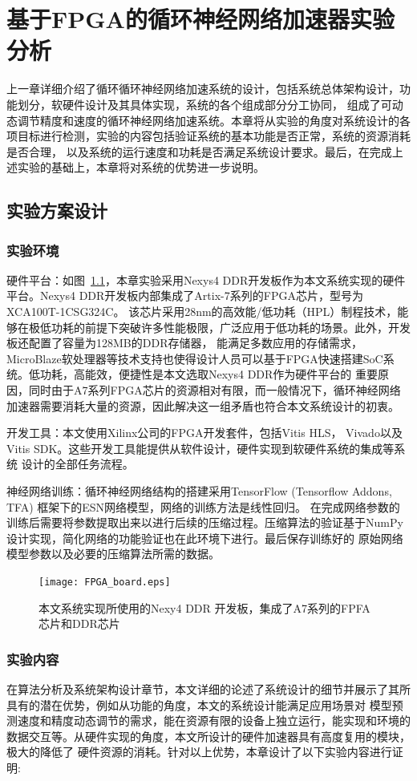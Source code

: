 \chapter{基于FPGA的循环神经网络加速器实验分析}
上一章详细介绍了循环循环神经网络加速系统的设计，包括系统总体架构设计，功能划分，软硬件设计及其具体实现，系统的各个组成部分分工协同，
组成了可动态调节精度和速度的循环神经网络加速系统。本章将从实验的角度对系统设计的各项目标进行检测，实验的内容包括验证系统的基本功能是否正常，系统的资源消耗是否合理，
以及系统的运行速度和功耗是否满足系统设计要求。最后，在完成上述实验的基础上，本章将对系统的优势进一步说明。
\section{实验方案设计}
\subsection{实验环境}
硬件平台：如图~\ref{fig_board}，本章实验采用Nexys4 DDR开发板作为本文系统实现的硬件平台。Nexys4 DDR开发板内部集成了Artix-7系列的FPGA芯片，型号为XCA100T-1CSG324C。
该芯片采用28nm的高效能/低功耗（HPL）制程技术，能够在极低功耗的前提下突破许多性能极限，广泛应用于低功耗的场景。此外，开发板还配置了容量为128MB的DDR存储器，
能满足多数应用的存储需求，MicroBlaze软处理器等技术支持也使得设计人员可以基于FPGA快速搭建SoC系统。低功耗，高能效，便捷性是本文选取Nexys4 DDR作为硬件平台的
重要原因，同时由于A7系列FPGA芯片的资源相对有限，而一般情况下，循环神经网络加速器需要消耗大量的资源，因此解决这一组矛盾也符合本文系统设计的初衷。

开发工具：本文使用Xilinx公司的FPGA开发套件，包括Vitis HLS， Vivado以及Vitis SDK。这些开发工具能提供从软件设计，硬件实现到软硬件系统的集成等系统
设计的全部任务流程。

神经网络训练：循环神经网络结构的搭建采用TensorFlow (Tensorflow Addons, TFA) 框架下的ESN网络模型，网络的训练方法是线性回归。
在完成网络参数的训练后需要将参数提取出来以进行后续的压缩过程。压缩算法的验证基于NumPy设计实现，简化网络的功能验证也在此环境下进行。最后保存训练好的
原始网络模型参数以及必要的压缩算法所需的数据。
\begin{figure}
	\centering
	\texttt{[image: FPGA\_board.eps]}
	\caption{本文系统实现所使用的Nexy4 DDR 开发板，集成了A7系列的FPFA芯片和DDR芯片}
	\label{fig_board}
\end{figure}
\subsection{实验内容}
在算法分析及系统架构设计章节，本文详细的论述了系统设计的细节并展示了其所具有的潜在优势，例如从功能的角度，本文的系统设计能满足应用场景对
模型预测速度和精度动态调节的需求，能在资源有限的设备上独立运行，能实现和环境的数据交互等。从硬件实现的角度，本文所设计的硬件加速器具有高度复用的模块，极大的降低了
硬件资源的消耗。针对以上优势，本章设计了以下实验内容进行证明:

